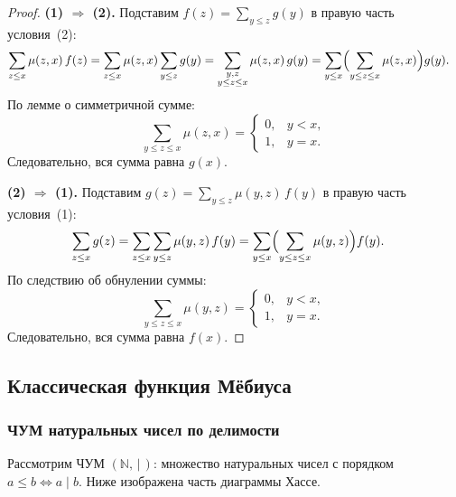 \begin{proof}
	\textbf{(1) $\Rightarrow$ (2).}
	Подставим $f(z) = \sum_{y \leq z} g(y)$ в правую часть условия~(2):
	\begin{align*}
		\sum_{z \leq x} \mu(z,x)\,f(z)
		&= \sum_{z \leq x} \mu(z,x) \sum_{y \leq z} g(y)
		= \sum_{\substack{y,z\\y \leq z \leq x}} \mu(z,x)\,g(y)
		= \sum_{y \leq x} \Bigl(\sum_{y \leq z \leq x} \mu(z,x)\Bigr) g(y).
	\end{align*}
	По лемме о симметричной сумме:
	\[
	\sum_{y \leq z \leq x} \mu(z,x)
	= \begin{cases} 0, & y < x, \\ 1, & y = x. \end{cases}
	\]
	Следовательно, вся сумма равна $g(x)$.\;\checkmark
	
	\medskip
	\textbf{(2) $\Rightarrow$ (1).}
	Подставим $g(z) = \sum_{y \leq z} \mu(y,z)\,f(y)$ в правую часть условия~(1):
	\begin{align*}
		\sum_{z \leq x} g(z)
		&= \sum_{z \leq x} \sum_{y \leq z} \mu(y,z)\,f(y)
		= \sum_{y \leq x} \Bigl(\sum_{y \leq z \leq x} \mu(y,z)\Bigr) f(y).
	\end{align*}
	По следствию об обнулении суммы:
	\[
	\sum_{y \leq z \leq x} \mu(y,z)
	= \begin{cases} 0, & y < x, \\ 1, & y = x. \end{cases}
	\]
	Следовательно, вся сумма равна $f(x)$.\;\checkmark
\end{proof}

\subsection{Классическая функция Мёбиуса}

\subsubsection*{ЧУМ натуральных чисел по делимости}

Рассмотрим ЧУМ $(\mathbb{N},\,|\,)$: множество натуральных чисел с порядком
$a \leq b \Leftrightarrow a \mid b$. Ниже изображена часть диаграммы Хассе.

